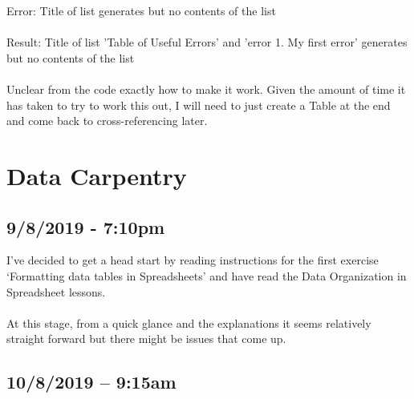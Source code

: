 \documentclass{article}
\begin{document}
Error: Title of list generates but no contents of the list\\\\
Result: Title of list 'Table of Useful Errors' and 'error 1. My first error' generates but no contents of the list\\\\

Unclear from the code exactly how to make it work. Given the amount of time it has taken to try to work this out, I will need to just create a Table at the end and come back to cross-referencing later.


\newpage
\section{Data Carpentry}
\subsection*{9/8/2019 - 7:10pm}
I’ve decided to get a head start by reading instructions for the first exercise ‘Formatting data tables in Spreadsheets’ and have read the Data Organization in Spreadsheet lessons.\\
\\
At this stage, from a quick glance and the explanations it seems relatively straight forward but there might be issues that come up.\par
\subsection*{10/8/2019 – 9:15am}
\end{document}
